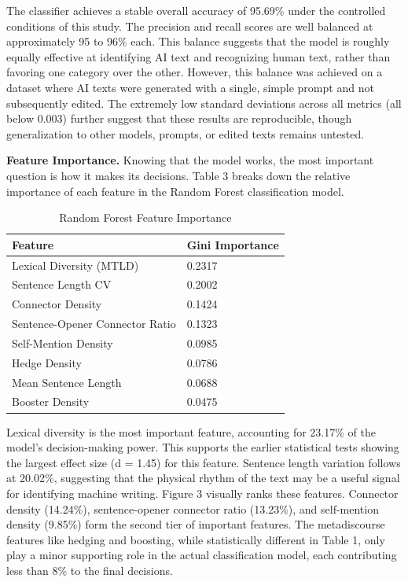 \documentclass{article}
\begin{document}
The classifier achieves a stable overall accuracy of 95.69\% under the controlled conditions of this study. The precision and recall scores are well balanced at approximately 95 to 96\% each. This balance suggests that the model is roughly equally effective at identifying AI text and recognizing human text, rather than favoring one category over the other. However, this balance was achieved on a dataset where AI texts were generated with a single, simple prompt and not subsequently edited. The extremely low standard deviations across all metrics (all below 0.003) further suggest that these results are reproducible, though generalization to other models, prompts, or edited texts remains untested.

\textbf{Feature Importance.} Knowing that the model works, the most important question is how it makes its decisions. Table 3 breaks down the relative importance of each feature in the Random Forest classification model.


\begin{table}[H]
\centering
\small
\begin{tabular}{ll}
\toprule
\textbf{Feature} & \textbf{Gini Importance} \\
\midrule
Lexical Diversity (MTLD) & 0.2317 \\
Sentence Length CV & 0.2002 \\
Connector Density & 0.1424 \\
Sentence-Opener Connector Ratio & 0.1323 \\
Self-Mention Density & 0.0985 \\
Hedge Density & 0.0786 \\
Mean Sentence Length & 0.0688 \\
Booster Density & 0.0475 \\
\bottomrule
\end{tabular}
\caption{Random Forest Feature Importance}
\end{table}

Lexical diversity is the most important feature, accounting for 23.17\% of the model's decision-making power. This supports the earlier statistical tests showing the largest effect size (d = 1.45) for this feature. Sentence length variation follows at 20.02\%, suggesting that the physical rhythm of the text may be a useful signal for identifying machine writing. Figure 3 visually ranks these features. Connector density (14.24\%), sentence-opener connector ratio (13.23\%), and self-mention density (9.85\%) form the second tier of important features. The metadiscourse features like hedging and boosting, while statistically different in Table 1, only play a minor supporting role in the actual classification model, each contributing less than 8\% to the final decisions.
\end{document}
